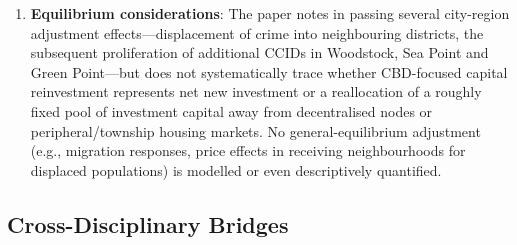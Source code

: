 \begin{enumerate}
  \item \textbf{Equilibrium considerations}: The paper notes in passing several city-region adjustment effects---displacement of crime into neighbouring districts, the subsequent proliferation of additional CCIDs in Woodstock, Sea Point and Green Point---but does not systematically trace whether CBD-focused capital reinvestment represents net new investment or a reallocation of a roughly fixed pool of investment capital away from decentralised nodes or peripheral/township housing markets. No general-equilibrium adjustment (e.g., migration responses, price effects in receiving neighbourhoods for displaced populations) is modelled or even descriptively quantified.
\end{enumerate}

\subsection*{Cross-Disciplinary Bridges}

